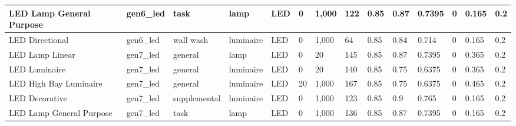 \begin{center}
\begin{landscape}
\begin{longtable}{|p{0.75in}|p{0.65in}|p{0.47in}|p{0.4in}|p{0.45in}|p{0.4in}|p{0.4in}|p{0.4in}|p{0.4in}|p{0.4in}|p{0.4in}|p{0.4in}|p{0.4in}|p{0.4in}|}
  LED Lamp General Purpose   & gen6\_led               & task                   & lamp          & LED                     & 0                     & 1,000                  & 122                             & 0.85                    & 0.87                        & 0.7395               & 0                   & 0.165            & 0.2              \\ \hline
  LED Directional            & gen6\_led               & wall wash              & luminaire     & LED                     & 0                     & 1,000                  & 64                              & 0.85                    & 0.84                        & 0.714                & 0                   & 0.165            & 0.2              \\ \hline
  LED Lamp Linear            & gen7\_led               & general                & lamp          & LED                     & 0                     & 20                    & 145                             & 0.85                    & 0.87                        & 0.7395               & 0                   & 0.365            & 0.2              \\ \hline
  LED Luminaire              & gen7\_led               & general                & luminaire     & LED                     & 0                     & 20                    & 140                             & 0.85                    & 0.75                        & 0.6375               & 0                   & 0.365            & 0.2              \\ \hline
  LED High Bay Luminaire     & gen7\_led               & general                & luminaire     & LED                     & 20                    & 1,000                  & 167                             & 0.85                    & 0.75                        & 0.6375               & 0                   & 0.465            & 0.2              \\ \hline
  LED Decorative             & gen7\_led               & supplemental           & luminaire     & LED                     & 0                     & 1,000                  & 123                             & 0.85                    & 0.9                         & 0.765                & 0                   & 0.165            & 0.2              \\ \hline
  LED Lamp General Purpose   & gen7\_led               & task                   & lamp          & LED                     & 0                     & 1,000                  & 136                             & 0.85                    & 0.87                        & 0.7395               & 0                   & 0.165            & 0.2              \\ \hline

\end{longtable}
\end{landscape}
\end{center}
